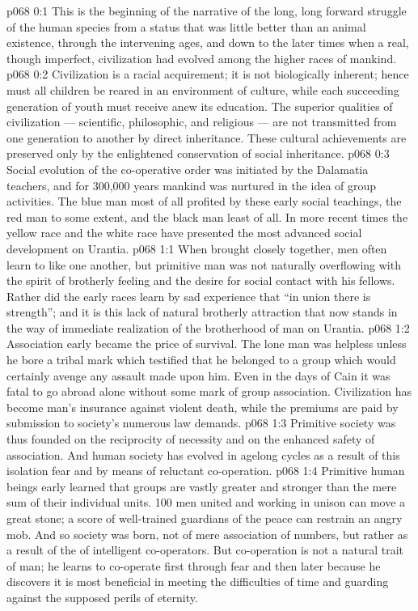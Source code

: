 \author{Melchizedek}
\vs p068 0:1 This is the beginning of the narrative of the long, long forward struggle of the human species from a status that was little better than an animal existence, through the intervening ages, and down to the later times when a real, though imperfect, civilization had evolved among the higher races of mankind.
\vs p068 0:2 Civilization is a racial acquirement; it is not biologically inherent; hence must all children be reared in an environment of culture, while each succeeding generation of youth must receive anew its education. The superior qualities of civilization --- scientific, philosophic, and religious --- are not transmitted from one generation to another by direct inheritance. These cultural achievements are preserved only by the enlightened conservation of social inheritance.
\vs p068 0:3 Social evolution of the co\hyp{}operative order was initiated by the Dalamatia teachers, and for 300,000 years mankind was nurtured in the idea of group activities. The blue man most of all profited by these early social teachings, the red man to some extent, and the black man least of all. In more recent times the yellow race and the white race have presented the most advanced social development on Urantia.
\vs p068 1:1 When brought closely together, men often learn to like one another, but primitive man was not naturally overflowing with the spirit of brotherly feeling and the desire for social contact with his fellows. Rather did the early races learn by sad experience that “in union there is strength”; and it is this lack of natural brotherly attraction that now stands in the way of immediate realization of the brotherhood of man on Urantia.
\vs p068 1:2 Association early became the price of survival. The lone man was helpless unless he bore a tribal mark which testified that he belonged to a group which would certainly avenge any assault made upon him. Even in the days of Cain it was fatal to go abroad alone without some mark of group association. Civilization has become man’s insurance against violent death, while the premiums are paid by submission to society’s numerous law demands.
\vs p068 1:3 Primitive society was thus founded on the reciprocity of necessity and on the enhanced safety of association. And human society has evolved in agelong cycles as a result of this isolation fear and by means of reluctant co\hyp{}operation.
\vs p068 1:4 \pc Primitive human beings early learned that groups are vastly greater and stronger than the mere sum of their individual units. 100 men united and working in unison can move a great stone; a score of well\hyp{}trained guardians of the peace can restrain an angry mob. And so society was born, not of mere association of numbers, but rather as a result of the  of intelligent co\hyp{}operators. But co\hyp{}operation is not a natural trait of man; he learns to co\hyp{}operate first through fear and then later because he discovers it is most beneficial in meeting the difficulties of time and guarding against the supposed perils of eternity.
